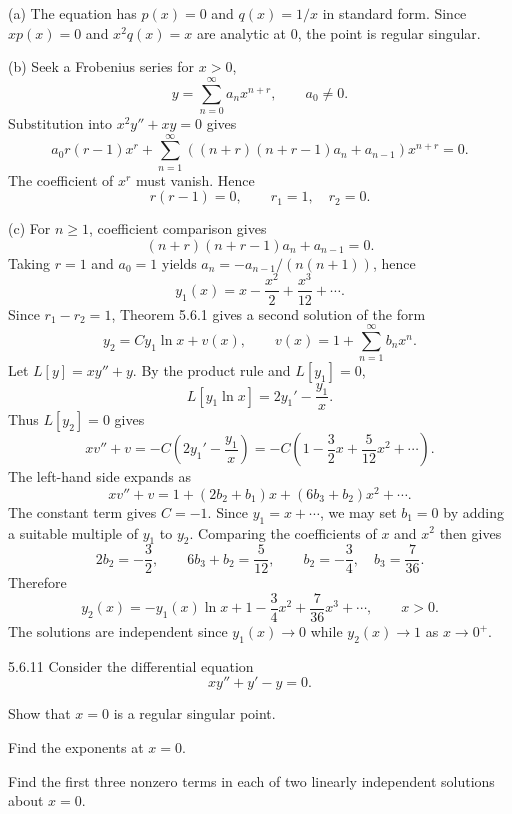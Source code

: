 \documentclass[11pt,oneside]{article}
\begin{document}
\begin{solution}
\noindent\textup{(a)} The equation has $p(x)=0$ and $q(x)=1/x$ in standard form. Since $xp(x)=0$ and $x^2q(x)=x$ are analytic at $0$, the point is regular singular.

\noindent\textup{(b)} Seek a Frobenius series for $x>0$,
\[
    y=\sum_{n=0}^{\infty}a_nx^{n+r}, \qquad a_0\ne0.
\]
Substitution into $x^2y''+xy=0$ gives
\[
    a_0r(r-1)x^r+\sum_{n=1}^{\infty}((n+r)(n+r-1)a_n+a_{n-1})x^{n+r}=0.
\]
The coefficient of $x^r$ must vanish. Hence
\[
    \boxed{r(r-1)=0, \qquad r_1=1, \quad r_2=0}.
\]

\noindent\textup{(c)} For $n\geq1$, coefficient comparison gives
\[
    (n+r)(n+r-1)a_n+a_{n-1}=0.
\]
Taking $r=1$ and $a_0=1$ yields $a_n=-a_{n-1}/(n(n+1))$, hence
\[
    \boxed{y_1(x)=x-\frac{x^2}{2}+\frac{x^3}{12}+\cdots}.
\]
Since $r_1-r_2=1$, Theorem 5.6.1 gives a second solution of the form
\[
    y_2=Cy_1\ln x+v(x), \qquad v(x)=1+\sum_{n=1}^{\infty}b_nx^n.
\]
Let $L[y]=xy''+y$. By the product rule and $L[y_1]=0$,
\[
    L[y_1\ln x]=2y_1'-\frac{y_1}{x}.
\]
Thus $L[y_2]=0$ gives
\[
    xv''+v=-C\left(2y_1'-\frac{y_1}{x}\right)
    =-C\left(1-\frac32x+\frac5{12}x^2+\cdots\right).
\]
The left-hand side expands as
\[
    xv''+v=1+(2b_2+b_1)x+(6b_3+b_2)x^2+\cdots.
\]
The constant term gives $C=-1$. Since $y_1=x+\cdots$, we may set $b_1=0$ by adding a suitable multiple of $y_1$ to $y_2$. Comparing the coefficients of $x$ and $x^2$ then gives
\[
    2b_2=-\frac32, \qquad 6b_3+b_2=\frac5{12},
    \qquad b_2=-\frac34, \quad b_3=\frac7{36}.
\]
Therefore
\[
    \boxed{y_2(x)=-y_1(x)\ln x+1-\frac34x^2+\frac7{36}x^3+\cdots},
    \qquad x>0.
\]
The solutions are independent since $y_1(x)\to0$ while $y_2(x)\to1$ as $x\to0^+$.
\end{solution}

\begin{problem}{5.6.11}
Consider the differential equation
\[
    xy''+y'-y=0.
\]
\begin{problemsubparts}
    \item Show that $x=0$ is a regular singular point.
    \item Find the exponents at $x=0$.
    \item Find the first three nonzero terms in each of two linearly independent solutions about $x=0$.
\end{problemsubparts}
\end{problem}
\end{document}
